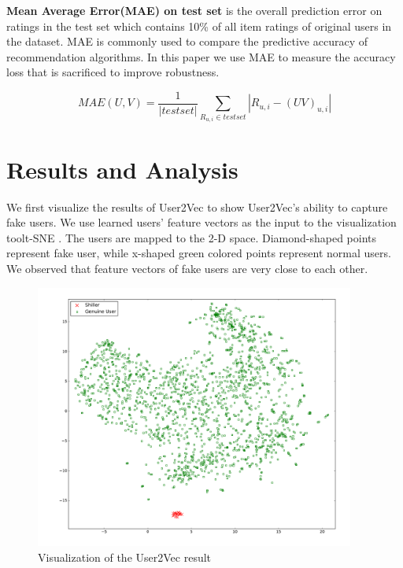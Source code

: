 \documentclass[master,english,final]{kaist-ucs}
\begin{document}
\textbf{Mean Average Error(MAE) on test set} is the overall prediction error on ratings in the test set which contains 10\% of all item ratings of original users in the dataset.
MAE is commonly used to compare the predictive accuracy of recommendation algorithms.
In this paper we use MAE to measure the accuracy loss that is sacrificed to improve robustness.

\begin{equation}
MAE(U,V) = \frac{1}{|test set|} \sum_{R_{u,i} \in test set} |R_{u,i}-(UV)_{u,i}|
\end{equation}



\section{Results and Analysis}


We first visualize the results of User2Vec to show User2Vec's ability to capture fake users.
We use learned users' feature vectors as the input to the visualization toolt-SNE \cite{TSNE}.
The users are mapped to the 2-D space.
Diamond-shaped points represent fake user, while x-shaped green colored points represent normal users.
We observed that feature vectors of fake users are very close to each other.
\begin{figure}[h]
    \centerline{\includegraphics[width=10.5cm]{figure/user2vec_result}}
    \caption{  Visualization of the User2Vec result } \label{user2vec_result}
\end{figure}

\end{document}
